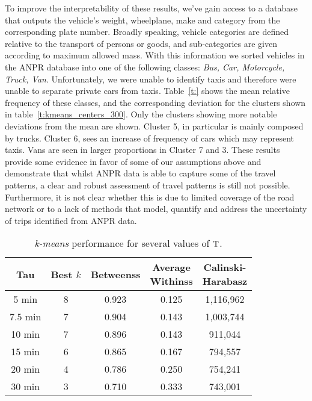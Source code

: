 To improve the interpretability of these results, we've gain access to a database that outputs the vehicle's weight, wheelplane, make and category from the corresponding plate number. Broadly speaking, vehicle categories are defined relative to the transport of persons or goods, and sub-categories are given according to maximum allowed mass. With this information we sorted vehicles in the ANPR database into one of the following classes: \textit{Bus, Car, Motorcycle, Truck, Van}. Unfortunately, we were unable to identify taxis and therefore were unable to separate private cars from taxis. Table~\ref{t:} shows the mean relative frequency of these classes, and the corresponding deviation for the clusters shown in table~\ref{t:kmeans_centers_300}. Only the clusters showing more notable deviations from the mean are shown. Cluster 5, in particular is mainly composed by trucks. Cluster 6, sees an increase of frequency of cars which may represent taxis. Vans are seen in larger proportions in Cluster 7 and 3. These results provide some evidence in favor of some of our assumptions above and demonstrate that whilst ANPR data is able to capture some of the travel patterns, a clear and robust assessment of travel patterns is still not possible. Furthermore, it is not clear whether this is due to limited coverage of the road network or to a lack of methods that model, quantify and address the uncertainty of trips identified from ANPR data.




\begin{table}[t]
\centering
\tabcolsep=0.17cm
\begin{tabular}{c c c c c}
  \hline
Tau & Best $k$ & Betweenss & \thead{Average\\Withinss} & \thead{Calinski-\\Harabasz} \\
  \hline
5 min &   8 & 0.923 & 0.125 & 1,116,962 \\
  7.5 min &   7 & 0.904 & 0.143 & 1,003,744 \\
  10 min&   7 & 0.896 & 0.143 &   911,044 \\
  15 min &   6 & 0.865 & 0.167 &   794,557 \\
  20 min &   4 & 0.786 & 0.250 &   754,241 \\
  30 min &   3 & 0.710 & 0.333 &   743,001 \\
   \hline
\end{tabular}
\caption{\emph{k-means} performance for several values of $\mathrm{T}$.}
\label{t:tau_comparison}
\end{table}

